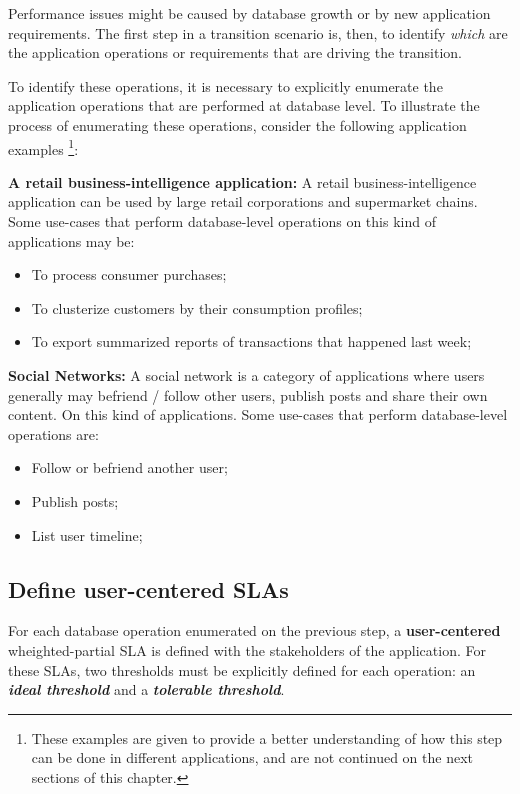 Performance issues might be caused by database growth or by new application requirements. The first step in a transition scenario is, then, to identify \textit{which} are the application operations or requirements that are driving the transition. 

To identify these operations, it is necessary to explicitly enumerate the application operations that are performed at database level. To illustrate the process of enumerating these operations, consider the following application examples \footnote{These examples are given to provide a better understanding of how this step can be done in different applications, and are not continued on the next sections of this chapter.}: 

\textbf{A retail business-intelligence application: } A retail business-intelligence application can be used by large retail corporations and supermarket chains. Some use-cases that perform database-level operations on this kind of applications may be:

\begin{itemize}
\item{To process consumer purchases;}
\item{To clusterize customers by their consumption profiles;}
\item{To export summarized reports of transactions that happened last week;}
\end{itemize}

\textbf{Social Networks:} A social network is a category of applications where users generally may befriend / follow other users, publish posts and share their own content. On this kind of applications. Some use-cases that perform database-level operations are: 

\begin{itemize}
\item{Follow or befriend another user;}
\item{Publish posts;}
\item{List user timeline;}
\end{itemize}


\subsection{Define user-centered SLAs}
\label{defineusercenteredslas}
For each database operation enumerated on the previous step, a \textbf{user-centered} wheighted-partial SLA is defined with the stakeholders of the application. For these SLAs, two thresholds must be explicitly defined for each operation: an \textbf{\textit{ideal threshold}} and a \textbf{\textit{tolerable threshold}}.

